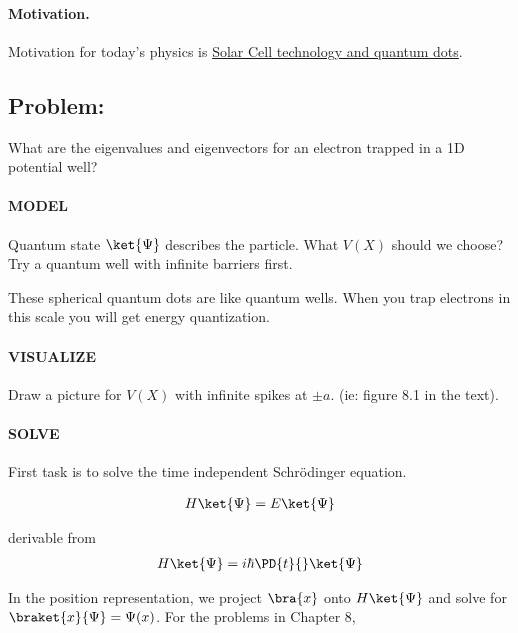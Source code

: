 %
%

\paragraph{Motivation.}  Motivation for today's physics is \href{http://physicsworld.com/cws/article/news/38046}{Solar Cell technology and quantum dots}.

\subsection{Problem:}
What are the eigenvalues and eigenvectors for an electron trapped in a 1D potential well?

\paragraph{MODEL}
Quantum state $\ket{\Psi}$ describes the particle.  What $V(X)$ should we choose?  Try a quantum well with infinite barriers first.

These spherical quantum dots are like quantum wells.  When you trap electrons in this scale you will get energy quantization.

\paragraph{VISUALIZE}
Draw a picture for $V(X)$ with infinite spikes at $\pm a$. (ie: figure 8.1 in the text).

\paragraph{SOLVE}
First task is to solve the time independent Schr\"{o}dinger equation.

\begin{align}\label{eqn:PHY356Lecture9:1}
H \ket{\Psi} = E \ket{\Psi}
\end{align}

derivable from
\begin{align}\label{eqn:PHY356Lecture9:2}
H \ket{\Psi} = i \hbar \PD{t}{} \ket{\Psi}
\end{align}

In the position representation, we project $\bra{x}$ onto $H \ket{\Psi}$ and solve for $\braket{x}{\Psi} = \Psi(x)$.  For the problems in Chapter 8,

